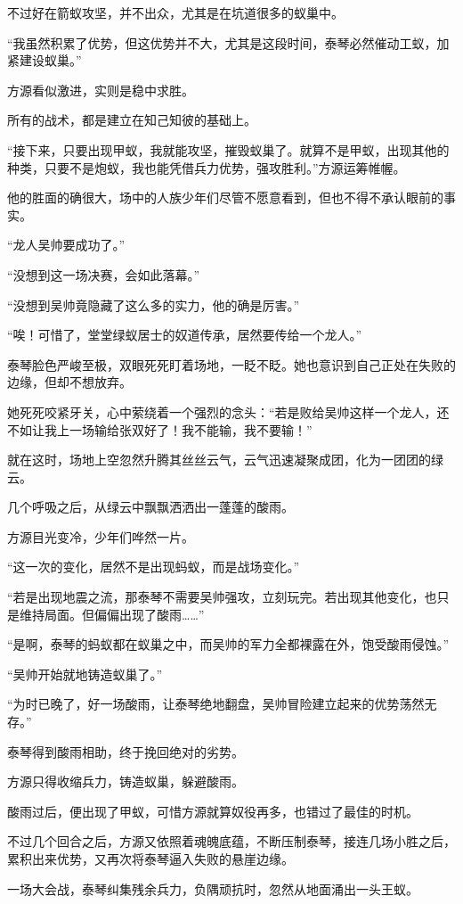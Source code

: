 \begin{this_body}
不过好在箭蚁攻坚，并不出众，尤其是在坑道很多的蚁巢中。

“我虽然积累了优势，但这优势并不大，尤其是这段时间，泰琴必然催动工蚁，加紧建设蚁巢。”

方源看似激进，实则是稳中求胜。

所有的战术，都是建立在知己知彼的基础上。

“接下来，只要出现甲蚁，我就能攻坚，摧毁蚁巢了。就算不是甲蚁，出现其他的种类，只要不是炮蚁，我也能凭借兵力优势，强攻胜利。”方源运筹帷幄。

他的胜面的确很大，场中的人族少年们尽管不愿意看到，但也不得不承认眼前的事实。

“龙人吴帅要成功了。”

“没想到这一场决赛，会如此落幕。”

“没想到吴帅竟隐藏了这么多的实力，他的确是厉害。”

“唉！可惜了，堂堂绿蚁居士的奴道传承，居然要传给一个龙人。”

泰琴脸色严峻至极，双眼死死盯着场地，一眨不眨。她也意识到自己正处在失败的边缘，但却不想放弃。

她死死咬紧牙关，心中萦绕着一个强烈的念头：“若是败给吴帅这样一个龙人，还不如让我上一场输给张双好了！我不能输，我不要输！”

就在这时，场地上空忽然升腾其丝丝云气，云气迅速凝聚成团，化为一团团的绿云。

几个呼吸之后，从绿云中飘飘洒洒出一蓬蓬的酸雨。

方源目光变冷，少年们哗然一片。

“这一次的变化，居然不是出现蚂蚁，而是战场变化。”

“若是出现地震之流，那泰琴不需要吴帅强攻，立刻玩完。若出现其他变化，也只是维持局面。但偏偏出现了酸雨……”

“是啊，泰琴的蚂蚁都在蚁巢之中，而吴帅的军力全都裸露在外，饱受酸雨侵蚀。”

“吴帅开始就地铸造蚁巢了。”

“为时已晚了，好一场酸雨，让泰琴绝地翻盘，吴帅冒险建立起来的优势荡然无存。”

泰琴得到酸雨相助，终于挽回绝对的劣势。

方源只得收缩兵力，铸造蚁巢，躲避酸雨。

酸雨过后，便出现了甲蚁，可惜方源就算奴役再多，也错过了最佳的时机。

不过几个回合之后，方源又依照着魂魄底蕴，不断压制泰琴，接连几场小胜之后，累积出来优势，又再次将泰琴逼入失败的悬崖边缘。

一场大会战，泰琴纠集残余兵力，负隅顽抗时，忽然从地面涌出一头王蚁。


\end{this_body}
